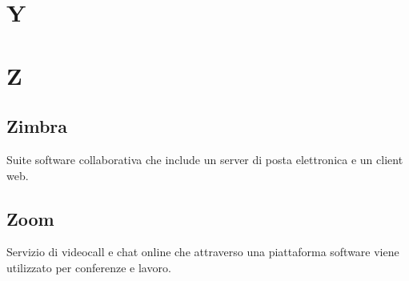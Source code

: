 \newpage
\section{Y}


\newpage
\section{Z}
\subsection*{Zimbra}
Suite software collaborativa che include un server di posta elettronica e un client web.

\subsection*{Zoom}
Servizio di videocall e chat online che attraverso una piattaforma software viene utilizzato per conferenze e lavoro.
